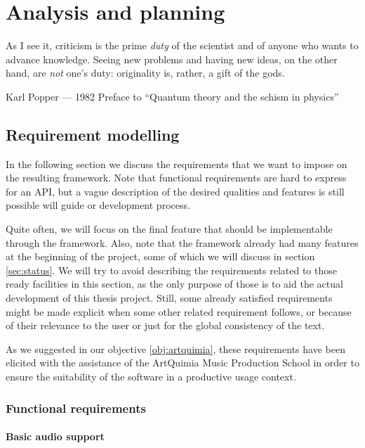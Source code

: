 
\chapter{Analysis and planning}

\epigraph{As I see it, criticism is the prime \emph{duty} of the
  scientist and of anyone who wants to advance knowledge. Seeing new
  problems and having new ideas, on the other hand, are \emph{not}
  one's duty: originality is, rather, a gift of the gods.}{Karl Popper
  --- 1982 Preface to ``Quantum theory and the schism in physics''}

\section{Requirement modelling}

In the following section we discuss the requirements that we want to
impose on the resulting framework. Note that functional requirements
are hard to express for an API, but a vague description of the desired
qualities and features is still possible will guide or development
process.

Quite often, we will focus on the final feature that should be
implementable through the framework. Also, note that the framework
already had many features at the beginning of the project, some of
which we will discuss in section \ref{sec:status}. We will try to
avoid describing the requirements related to those ready facilities in
this section, as the only purpose of those is to aid the actual
development of this thesis project. Still, some already satisfied
requirements might be made explicit when some other related
requirement follows, or because of their relevance to the user or just
for the global consistency of the text.

As we suggested in our objective \ref{obj:artquimia}, these
requirements have been elicited with the assistance of the ArtQuimia
Music Production School in order to ensure the suitability of the
software in a productive usage context.

\subsection{Functional requirements}

\subsubsection{Basic audio support}

